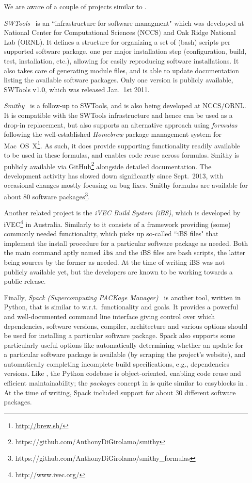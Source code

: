 We are aware of a couple of projects similar to \easybuild{}.

\emph{SWTools}~\cite{swtools, jones08} is an ``infrastructure for software
managment" which was developed at National Center for Computational Sciences (NCCS)
and Oak Ridge National Lab (ORNL). It defines a structure for organizing a set of
(bash) scripts per supported software package, one per major installation step
(configuration, build, test, installation, etc.), allowing for easily reproducing 
software installations. It also takes care of generating module files, and is
able to update documentation listing the available software packages.
Only one version is publicly available, SWTools v1.0, which was released Jan.~1st 2011.

\emph{Smithy}~\cite{smithy} is a follow-up to SWTools, and is also being developed
at NCCS/ORNL. It is compatible with the SWTools infrastructure and hence can be
used as a drop-in replacement, but also supports an alternative approach using
\emph{formulas} following the well-established \emph{Homebrew} package management 
system for Mac~OS~X\footnote{\url{http://brew.sh/}}. As such, it does provide
supporting functionality readily available to be used in these formulas, and enables
code reuse across formulas. Smithy is publicly available via
GitHub\footnote{https://github.com/AnthonyDiGirolamo/smithy} alongside detailed
documentation. The development activity has slowed down significantly since
Sept.~2013, with occasional changes mostly focusing on bug fixes.
Smithy formulas are available for about 80 software
packages\footnote{https://github.com/AnthonyDiGirolamo/smithy\_formulas}.

Another related project is the \emph{iVEC Build System (iBS)}, which is developed 
by iVEC\footnote{http://www.ivec.org/} in Australia. Similarly to \easybuild{}
it consists of a framework providing (some) commonly needed functionality, which
picks up so-called ``iBS files" that implement the install procedure for a 
particular software package as needed. Both the main command aptly named \texttt{ibs}
and the iBS files are bash scripts, the latter being sources by the former as needed.
At the time of writing iBS was not publicly available yet, but the developers are
known to be working towards a public release.

Finally, \emph{Spack (Supercomputing PACKage Manager)}~\cite{spack} is another
tool, written in Python, that is similar to \easybuild{} w.r.t.\ functionality and
goals. It provides a powerful and well-documented command line interface giving
control over which dependencies, software versions, compiler, architecture and
various options should be used for installing a particular software package.
Spack also supports some particularly useful options like automatically determining
whether an update for a particular software package is available
(by scraping the project's website), and automatically completing
incomplete build specifications, e.g., dependencies versions. Like
\easybuild{}, the Python codebase is object-oriented, enabling code reuse and
efficient maintainability; the \emph{packages} concept in is quite similar to
easyblocks in \easybuild{}. At the time of writing, Spack included support for about
30 different software packages.

